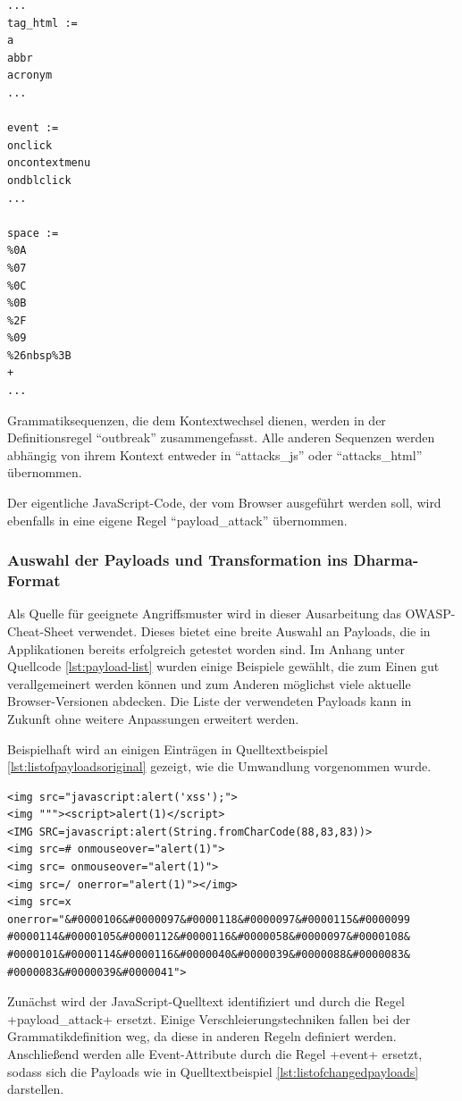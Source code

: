 \begin{lstlisting}[caption={Dharma: Gruppierung der Payload-Elemente},label=lst:xss.dg-transformation]
...
tag_html :=
a
abbr
acronym
...

event :=
onclick
oncontextmenu
ondblclick
...	

space :=
%0A
%07
%0C
%0B
%2F
%09
%26nbsp%3B
+
...
\end{lstlisting}

Grammatiksequenzen, die dem Kontextwechsel dienen, werden in der Definitionsregel ``outbreak'' zusammengefasst. Alle anderen Sequenzen werden abhängig von ihrem Kontext entweder in ``attacks\_js'' oder ``attacks\_html'' übernommen.

Der eigentliche JavaScript-Code, der vom Browser ausgeführt werden soll, wird ebenfalls in eine eigene Regel ``payload\_attack'' übernommen.

\subsubsection{Auswahl der Payloads und Transformation ins Dharma-Format}
Als Quelle für geeignete Angriffsmuster wird in dieser Ausarbeitung das OWASP-Cheat-Sheet verwendet. Dieses bietet eine breite Auswahl an Payloads, die in Applikationen bereits erfolgreich getestet worden sind. Im Anhang unter Quellcode \ref{lst:payload-list} wurden einige Beispiele gewählt, die zum Einen gut verallgemeinert werden können und zum Anderen möglichst viele aktuelle Browser-Versionen abdecken. Die Liste der verwendeten Payloads kann in Zukunft ohne weitere Anpassungen erweitert werden.

Beispielhaft wird an einigen Einträgen in  Quelltextbeispiel \ref{lst:listofpayloadsoriginal} gezeigt, wie die Umwandlung vorgenommen wurde.

\begin{lstlisting}[caption={Dharma: Umwandlung gegebener Payloads - Teil 1},label=lst:listofpayloadsoriginal]
<img src="javascript:alert('xss');">
<img """><script>alert(1)</script>
<IMG SRC=javascript:alert(String.fromCharCode(88,83,83))>
<img src=# onmouseover="alert(1)">
<img src= onmouseover="alert(1)">
<img src=/ onerror="alert(1)"></img>
<img src=x onerror="&#0000106&#0000097&#0000118&#0000097&#0000115&#0000099 #0000114&#0000105&#0000112&#0000116&#0000058&#0000097&#0000108& #0000101&#0000114&#0000116&#0000040&#0000039&#0000088&#0000083& #0000083&#0000039&#0000041">
\end{lstlisting}

Zunächst wird der JavaScript-Quelltext identifiziert und durch die Regel +payload\_attack+ ersetzt. Einige Verschleierungstechniken fallen bei der Grammatikdefinition weg, da diese in anderen Regeln definiert werden.  Anschließend werden alle Event-Attribute durch die Regel +event+ ersetzt, sodass sich die Payloads wie in Quelltextbeispiel \ref{lst:listofchangedpayloads} darstellen.

